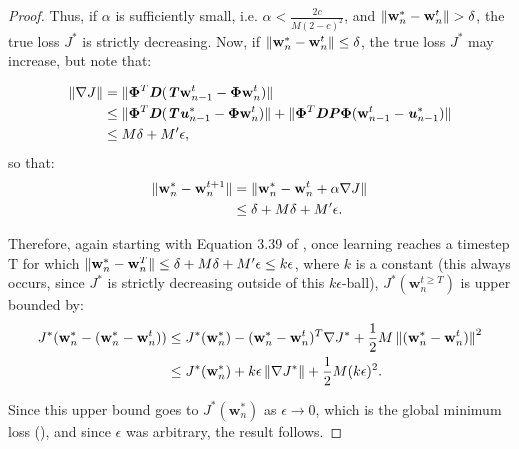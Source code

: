 \documentclass{article}
\renewcommand{\vec}[1]{\textbf{\textit{#1}}}
\newcommand{\target}{\vec{u}}
\newcommand{\params}{\textbf{w}}
\newcommand{\Features}{\bm{\Phi}}
\newcommand{\transitionmtx}{\textbf{\textit{P}}}
\newcommand{\densitymtx}{\textbf{\textit{D}}}
\newcommand{\bellmanop}{\textbf{\textit{T}}}
\newcommand{\smashednorm}[1]{\left\lVert \smash{#1} \right\rVert}
\begin{document}
\begin{proof}
	Thus, if $\alpha$ is sufficiently small, i.e. $\alpha < \frac{2c}{M(2-c)^2}$, and $\smashednorm{\params_n^* - \params_n^t} > \delta$, the true loss $J^*$ is strictly decreasing. Now, if $\smashednorm{\params_n^* - \params_n^t} \leq \delta$, the true loss $J^*$ may increase, but note that:

	\begin{align*}
	\begin{split}
		\smashednorm{\nabla J}
		&= \smashednorm{\Features^T\densitymtx(\bellmanop\params_{n-1}^t - \Features\params_n^t)}\\
		&\leq \smashednorm{\Features^T\densitymtx(\bellmanop\target^*_{n-1} - \Features\params_n^t)} + \smashednorm{\Features^T\densitymtx\transitionmtx\Features(\params_{n-1}^t - \target^*_{n-1})}\\
		&\leq M\delta + M'\epsilon,
	\end{split}
	\end{align*}
	so that:
	\begin{equation}
	\begin{split}
		\smashednorm{\params_n^* - \params_n^{t+1}} &= \smashednorm{\params_n^* - \params_n^t + \alpha \nabla J}\\
		&\leq \delta + M\delta + M'\epsilon.\\
	\end{split}
	\end{equation}

	Therefore, again starting with Equation 3.39 of \cite{bertsekas1996neuro}, once learning reaches a timestep T for which $\smashednorm{\params_n^* - \params_n^{T}} \leq \delta  + M\delta + M'\epsilon \leq k\epsilon$, where $k$ is a constant (this always occurs, since $J^*$ is strictly decreasing outside of this $k\epsilon$-ball), $J^*(\params_n^{t \geq T})$ is upper bounded by:
	\begin{equation}
	\begin{split}
	J^*(\params_n^* - (\params_n^* - \params_n^t))
	&\leq J^*(\params_n^*) - (\params_n^* - \params_n^t)^T\nabla J^* + \frac{1}{2}M\smashednorm{(\params_n^* - \params_n^t)}^2\\
	&\leq J^*(\params_n^*) + k\epsilon \smashednorm{\nabla J^*} + \frac{1}{2}M(k\epsilon)^2.\\
	\end{split}
	\end{equation}

	Since this upper bound goes to $J^*(\params_n^*)$ as $\epsilon \to 0$, which is the global minimum loss (\cite{tsitsiklis1997analysis}), and since $\epsilon$ was arbitrary, the result follows.

\end{proof}
\end{document}
